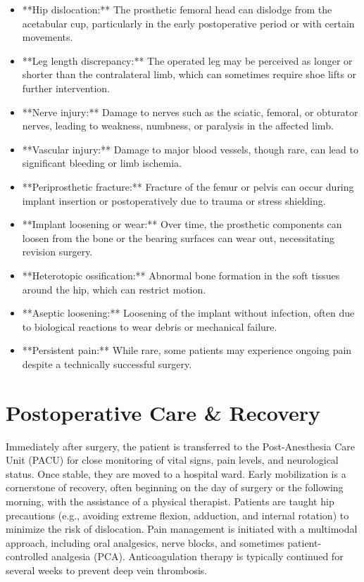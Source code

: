 \begin{itemize}
  \item **Hip dislocation:** The prosthetic femoral head can dislodge from the acetabular cup, particularly in the early postoperative period or with certain movements.
  \item **Leg length discrepancy:** The operated leg may be perceived as longer or shorter than the contralateral limb, which can sometimes require shoe lifts or further intervention.
  \item **Nerve injury:** Damage to nerves such as the sciatic, femoral, or obturator nerves, leading to weakness, numbness, or paralysis in the affected limb.
  \item **Vascular injury:** Damage to major blood vessels, though rare, can lead to significant bleeding or limb ischemia.
  \item **Periprosthetic fracture:** Fracture of the femur or pelvis can occur during implant insertion or postoperatively due to trauma or stress shielding.
  \item **Implant loosening or wear:** Over time, the prosthetic components can loosen from the bone or the bearing surfaces can wear out, necessitating revision surgery.
  \item **Heterotopic ossification:** Abnormal bone formation in the soft tissues around the hip, which can restrict motion.
  \item **Aseptic loosening:** Loosening of the implant without infection, often due to biological reactions to wear debris or mechanical failure.
  \item **Persistent pain:** While rare, some patients may experience ongoing pain despite a technically successful surgery.
\end{itemize}

\section*{Postoperative Care \& Recovery}
Immediately after surgery, the patient is transferred to the Post-Anesthesia Care Unit (PACU) for close monitoring of vital signs, pain levels, and neurological status. Once stable, they are moved to a hospital ward. Early mobilization is a cornerstone of recovery, often beginning on the day of surgery or the following morning, with the assistance of a physical therapist. Patients are taught hip precautions (e.g., avoiding extreme flexion, adduction, and internal rotation) to minimize the risk of dislocation. Pain management is initiated with a multimodal approach, including oral analgesics, nerve blocks, and sometimes patient-controlled analgesia (PCA). Anticoagulation therapy is typically continued for several weeks to prevent deep vein thrombosis.

